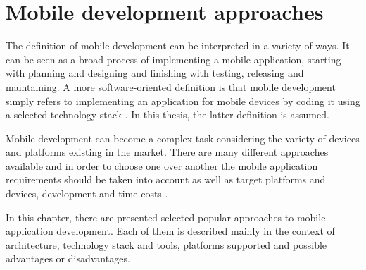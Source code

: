 
\chapter{Mobile development approaches}

The definition of mobile development can be interpreted in a variety of ways. It can be seen as a broad process of implementing a mobile application, starting with planning and designing and finishing with testing, releasing and maintaining. A more software-oriented definition is that mobile development simply refers to implementing an application for mobile devices by coding it using a selected technology stack \cite{microsoft_mobile_development}. In this thesis, the latter definition is assumed.

Mobile development can become a complex task considering the variety of devices and platforms existing in the market. There are many different approaches available and in order to choose one over another the mobile application requirements should be taken into account as well as target platforms and devices, development and time costs \cite{velvetech_mobile_dev_approaches}.

In this chapter, there are presented selected popular approaches to mobile application development. Each of them is described mainly in the context of architecture, technology stack and tools, platforms supported and possible advantages or disadvantages.




